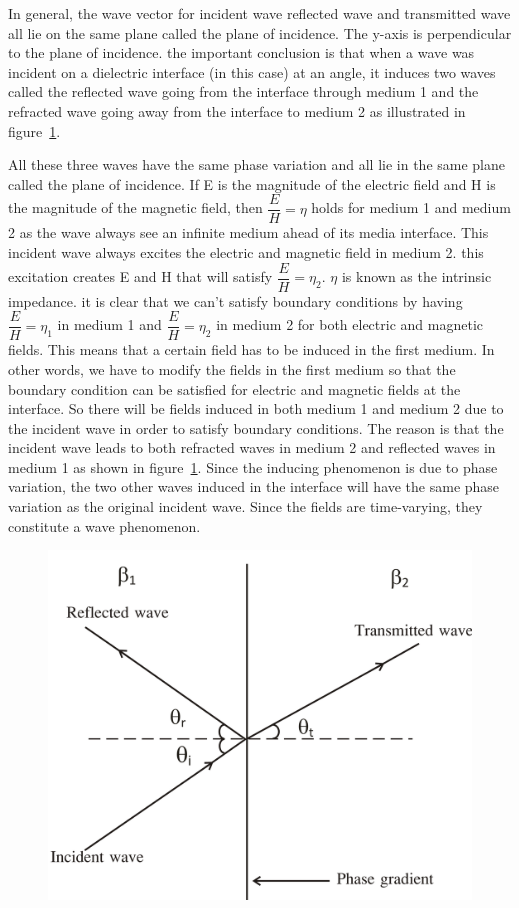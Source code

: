 In general, the wave vector for incident wave reflected wave and transmitted wave all lie on the same plane called the plane of incidence. The y-axis is perpendicular to the plane of incidence. the important conclusion is that when a wave was incident on a dielectric interface (in this case) at an angle, it induces two waves called the reflected wave going from the interface through medium 1  and the refracted wave going away from the interface to medium 2 as illustrated in figure~\ref{fig:group30e}.

All these three waves have the same phase variation and all lie in the same plane called the plane of incidence. If E is the magnitude of the electric field and H is the magnitude of the magnetic field, then $\dfrac{E}{H}=\eta$ holds for medium 1 and medium 2 as the wave always see an infinite medium ahead of its media interface. This incident wave always excites the electric and magnetic field in medium 2. this excitation creates E and H that will satisfy $\dfrac{E}{H}=\eta_2$. $\eta$ is known as the intrinsic impedance. it is clear that we can't satisfy boundary conditions by having $\dfrac{E}{H}=\eta_1$ in medium 1 and $\dfrac{E}{H}=\eta_2$ in medium 2 for both electric and magnetic fields. This means that a certain field has to be induced in the first medium. In other words, we have to modify the fields in the first medium so that the boundary condition can be satisfied for electric and magnetic fields at the interface. So there will be fields induced in both medium 1 and medium 2 due to the incident wave in order to satisfy boundary conditions. The reason is that the incident wave leads to both refracted waves in medium 2 and reflected waves in medium 1 as shown in figure~\ref{fig:group30e}. Since the inducing phenomenon is due to phase variation, the two other waves induced in the interface will have the same phase variation as the original incident wave. Since the fields are time-varying, they constitute a wave phenomenon.
\begin{figure}[h]
\centering
\includegraphics[width=.7\linewidth]{./graphics/group30e}
\caption{}
\label{fig:group30e}
\end{figure}

